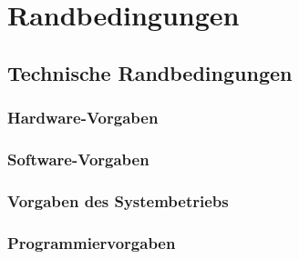 \section{Randbedingungen}

\subsection{Technische Randbedingungen}

\subsubsection{Hardware-Vorgaben}


\subsubsection{Software-Vorgaben}


\subsubsection{Vorgaben des Systembetriebs}

\subsubsection{Programmiervorgaben}


